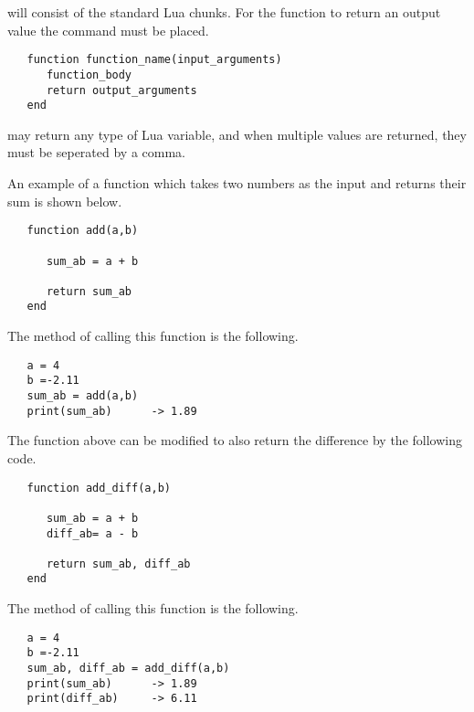  will consist of the standard
Lua chunks. For the function to return an output 
value the  command must be placed.
\begin{verbatim}
   function function_name(input_arguments)
      function_body
      return output_arguments
   end
\end{verbatim}
 may return any type of Lua
variable, and when multiple values are returned, they
must be seperated by a comma.

An example of a function which takes two numbers 
as the input and returns their sum is 
shown below.
\begin{verbatim}
   function add(a,b)

      sum_ab = a + b

      return sum_ab
   end
\end{verbatim} 
The method of calling this function is the following.
\begin{verbatim}
   a = 4
   b =-2.11
   sum_ab = add(a,b)
   print(sum_ab)      -> 1.89
\end{verbatim}
The function above can be modified to also return the difference
by the following code.
\begin{verbatim}
   function add_diff(a,b)

      sum_ab = a + b
      diff_ab= a - b

      return sum_ab, diff_ab
   end
\end{verbatim} 
The method of calling this function is the following.
\begin{verbatim}
   a = 4
   b =-2.11
   sum_ab, diff_ab = add_diff(a,b)
   print(sum_ab)      -> 1.89
   print(diff_ab)     -> 6.11
\end{verbatim}

